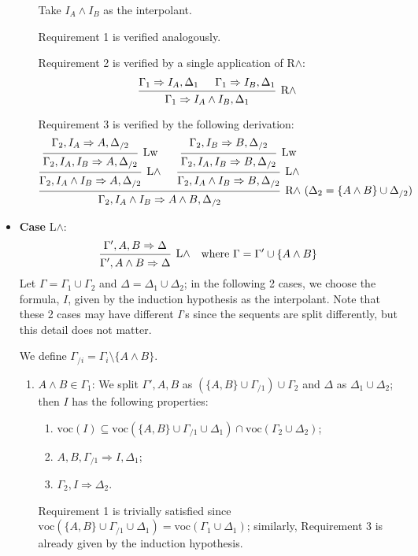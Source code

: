 \documentclass[a4paper]{article}
\newcommand{\voc}{\mathrm{voc}}
\begin{document}
\begin{itemize}
\begin{enumerate}
    Take $I_A \wedge I_B$ as the interpolant.
    
    Requirement 1 is verified analogously.
    
    Requirement 2 is verified by a single application of R$\wedge$:
    \[
      \begin{prooftree}
        \hypo{\Gamma_1 \Rightarrow I_A,\Delta_1}
        \hypo{\Gamma_1 \Rightarrow I_B,\Delta_1}
        \infer2[R$\wedge$]{\Gamma_1 \Rightarrow I_A \wedge I_B,\Delta_1}
      \end{prooftree}
    \]
    
    Requirement 3 is verified by the following derivation:
    \[
      \begin{prooftree}
        \hypo{\Gamma_2,I_A \Rightarrow A, \Delta_{/2}}
        \infer1[Lw]{\Gamma_2,I_A, I_B \Rightarrow A, \Delta_{/2}}
        \infer1[L$\wedge$]{\Gamma_2,I_A \wedge I_B \Rightarrow A, \Delta_{/2}}
        \hypo{\Gamma_2,I_B \Rightarrow B, \Delta_{/2}}
        \infer1[Lw]{\Gamma_2,I_A, I_B \Rightarrow B, \Delta_{/2}}
        \infer1[L$\wedge$]{\Gamma_2,I_A \wedge I_B \Rightarrow B, \Delta_{/2}}
        \infer2[R$\wedge$ ($\Delta_2 = \{A \wedge B\} \cup \Delta_{/2}$)]{\Gamma_2,I_A \wedge I_B \Rightarrow A \wedge B, \Delta_{/2}}
      \end{prooftree}
    \]
  \end{enumerate}
\item \textbf{Case} L$\wedge$:
  \begin{align*}
    \begin{prooftree}
      \hypo{\Gamma',A,B \Rightarrow \Delta}
      \infer1[L$\wedge$]{\Gamma',A \wedge B \Rightarrow \Delta}
    \end{prooftree}
    && \text{where $\Gamma = \Gamma' \cup \{A \wedge B\}$}
  \end{align*}
  Let $\Gamma = \Gamma_1 \cup \Gamma_2$ and $\Delta = \Delta_1 \cup \Delta_2$; in the following 2 cases, we choose the formula, $I$, given by the induction hypothesis as the interpolant.
  Note that these 2 cases may have different $I$'s since the sequents are split differently, but this detail does not matter.

  We define $\Gamma_{/i} = \Gamma_i \setminus \{A \wedge B\}$.
  \begin{enumerate}
  \item $A \wedge B \in \Gamma_1$: We split $\Gamma',A,B$ as $(\{A,B\} \cup \Gamma_{/1}) \cup \Gamma_2$ and $\Delta$ as $\Delta_1 \cup \Delta_2$; then $I$ has the following properties:
    \begin{enumerate}
    \item $\voc(I) \subseteq \voc(\{A,B\} \cup \Gamma_{/1} \cup \Delta_1) \cap \voc(\Gamma_2 \cup \Delta_2)$;
    \item $A,B,\Gamma_{/1} \Rightarrow I,\Delta_1$;
    \item $\Gamma_2,I \Rightarrow \Delta_2$.
    \end{enumerate}
    Requirement 1 is trivially satisfied since $\voc(\{A,B\} \cup \Gamma_{/1} \cup \Delta_1) = \voc(\Gamma_1 \cup \Delta_1)$; similarly, Requirement 3 is already given by the induction hypothesis.


\end{enumerate}
\end{itemize}
\end{document}

